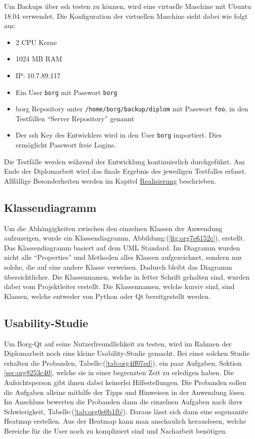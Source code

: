 Um Backups über \gls{ssh} testen zu können, wird eine virtuelle Maschine mit Ubuntu
18.04 verwendet. Die Konfiguration der virtuellen Maschine sieht dabei wie
folgt aus:
\begin{itemize}
\item 2 CPU Kerne
\item 1024 MB RAM
\item IP: 10.7.89.117
\item Ein User \texttt{borg} mit Passwort \texttt{borg}
\item \gls{borg} Repository unter \texttt{/home/borg/backup/diplom} mit Passwort \texttt{foo}, in
den Testfällen "`Server Repository"' genannt
\item Der \gls{ssh} Key des Entwicklers wird in den User \texttt{borg} importiert. Dies
ermöglicht Passwort freie Logins.
\end{itemize}

Die Testfälle werden während der Entwicklung kontinuierlich durchgeführt. Am
Ende der Diplomarbeit wird das finale Ergebnis des jeweiligen Testfalles
erfasst. Allfällige Besonderheiten werden im Kapitel \hyperref[sec:orgb833f22]{Realisierung}
beschrieben.

\subsection{Klassendiagramm}
\label{sec:orgd8ab406}

Um die Abhängigkeiten zwischen den einzelnen Klassen der Anwendung aufzuzeigen,
wurde ein Klassendiagramm, Abbildung:(\ref{fig:org7e6152c}), erstellt. Das
Klassendiagramm basiert auf dem UML Standard. Im Diagramm wurden nicht alle
"`Properties"' und Methoden alles Klassen aufgezeichnet, sondern nur solche, die
auf eine andere Klasse verweisen. Dadurch bleibt das Diagramm übersichtlicher.
Die Klassennamen, welche in fetter Schrift gehalten sind, wurden dabei vom
Projektleiter erstellt. Die Klassennamen, welche kursiv sind, sind Klassen, welche
entweder von Python oder Qt bereitgestellt werden.

\subsection{Usability-Studie}
\label{sec:org4a36f83}

Um Borg-Qt auf seine Nutzerfreundlichkeit zu testen, wird im Rahmen der
Diplomarbeit noch eine kleine Usability-Studie gemacht. Bei einer
solchen Studie erhalten die Probanden, Tabelle:(\ref{tab:org4ff07ed}), ein paar
Aufgaben, Sektion \ref{sec:org8253c40}, welche sie in einer begrenzten
Zeit zu erledigen haben. Die Aufsichtsperson gibt ihnen dabei keinerlei
Hilfestellungen. Die Probanden sollen die Aufgaben alleine mithilfe der Tipps
und Hinweisen in der Anwendung lösen. Im Anschluss bewerten die Probanden dann
die einzelnen Aufgaben nach ihrer Schwierigkeit,
Tabelle:(\ref{tab:org0e0b1fb}). Daraus lässt sich dann eine sogenannte Heatmap
erstellen. Aus der Heatmap kann man anschaulich herauslesen, welche Bereiche für
die User noch zu kompliziert sind und Nacharbeit benötigen.

